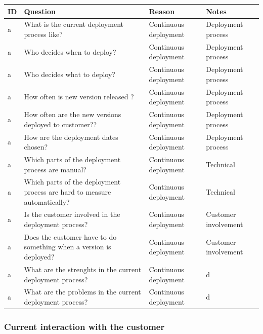 \documentclass[english]{tktltiki2}
\theoremstyle{definition}
\theoremstyle{remark}
\begin{document}
\begin{center}
    \begin{tabular}{ | l | l | l | p{5cm} |}
    \hline
    ID & Question & Reason & Notes \\ \hline
    a & What is the current deployment process like? & Continuous deployment & Deployment process \\ \hline
    a & Who decides when to deploy? & Continuous deployment & Deployment process \\ \hline %
    a & Who decides what to deploy? & Continuous deployment & Deployment process \\ \hline %
    a & How often is new version released ? & Continuous deployment & Deployment process \\ \hline
    a & How often are the new versions deployed to customer?? & Continuous deployment & Deployment process \\ \hline
    a & How are the deployment dates chosen? & Continuous deployment & Deployment process \\ \hline

    a & Which parts of the deployment process are manual? & Continuous deployment & Technical \\ \hline
    a & Which parts of the deployment process are hard to measure automatically? & Continuous deployment & Technical \\ \hline

    a & Is the customer involved in the deployment process? & Continuous deployment & Customer involvement \\ \hline
    a & Does the customer have to do something when a version is deployed? & Continuous deployment & Customer involvement \\ \hline

    a & What are the strenghts in the current deployment process? & Continuous deployment & d \\ \hline
    a & What are the problems in the current deployment process? & Continuous deployment & d \\ \hline
    \hline
    \end{tabular}
\end{center}

\subsubsection{Current interaction with the customer}
\end{document}
